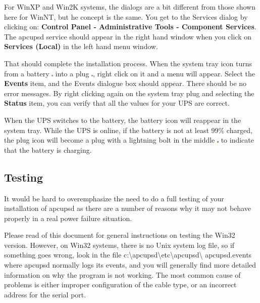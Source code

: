 {{{{{{{For WinXP and Win2K systems, the dialogs are a bit different from
those shown here for WinNT, but he concept is the same. You get to the
Services dialog by clicking on: {\bf Control Panel -\gt{} Administrative Tools
-\gt{} Component Services}. The apcupsd service should appear in the right
hand window when you click on {\bf Services (Local)} in the left hand menu
window.  

That should complete the installation process. When the system tray icon turns
from a battery \includegraphics{./onbatt.eps} into a plug
\includegraphics{./online.eps}, right click on it and a menu will appear.
Select the {\bf Events} item, and the Events dialogue box should appear. There
should be no error messages. By right clicking again on the system tray plug
and selecting the {\bf Status} item, you can verify that all the values for
your UPS are correct.  

When the UPS switches to the battery, the battery icon will reappear in the
system tray. While the UPS is online, if the battery is not at least 99\%
charged, the plug icon will become a plug with a lightning bolt in the middle
\includegraphics{./charging.eps} to indicate that the battery is charging. 

\label{Testing}

\subsection*{Testing}

\label{index-Windows_002c-Testing-173}
\label{index-Testing_002c-Windows-174}
It would be hard to overemphasize the need to do a full testing of your
installation of apcupsd as there are a number of reasons why it may not behave
properly in a real power failure situation.  

Please read 
 of this document for
general instructions on testing the Win32 version. However, on Win32 systems,
there is no Unix system log file, so if something goes wrong, look in the file
c:\textbackslash{}apcupsd\textbackslash{}etc\textbackslash{}apcupsd\textbackslash
{}apcupsd.events where apcupsd normally logs its events, and you will
generally find more detailed information on why the program is not working.
The most common cause of problems is either improper configuration of the
cable type, or an incorrect address for the serial port. 

}}}}}}}
